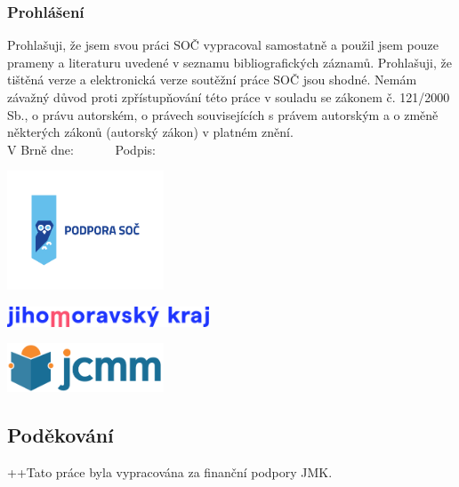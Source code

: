 \documentclass [12pt]{report}
\begin{document}
\newpage
\thispagestyle{empty}
\vspace*{14cm}
\subsubsection*{Prohlášení}

Prohlašuji, že jsem svou práci SOČ vypracoval samostatně a použil jsem pouze prameny a literaturu uvedené v seznamu bibliografických záznamů.
Prohlašuji, že tištěná verze a elektronická verze soutěžní práce SOČ jsou shodné. 
Nemám závažný důvod proti zpřístupňování této práce v souladu se zákonem č. 121/2000 Sb., o právu autorském, o právech souvisejících s právem autorským a o změně některých zákonů (autorský zákon) v platném znění. \\[1cm]
V Brně dne: \dotfill \ \ \ \ \ \  Podpis: \dotfill

\newpage
\thispagestyle{empty}
\begin{center}
\includegraphics[width=0.35\textwidth]{podpora_soc-horizontalni.png}
\end{center}
\vspace*{1.5cm}
\begin{center}
\includegraphics[width=0.45\textwidth]{logo_JMK_pruhledne.png}
\end{center}
\vspace*{2.2cm}
\begin{center}
\includegraphics[width=0.35\textwidth]{jcmm-logotype-positive1.png}
\end{center}
\vspace*{6.5cm}
\subsection*{Poděkování}
++Tato práce byla vypracována za finanční podpory JMK.
\end{document}

